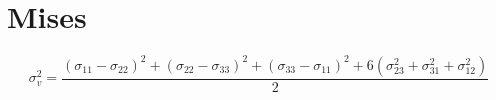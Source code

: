 
\section{Mises}

\begin{equation}\label{key}
\sigma_v^2 = \dfrac{ \left( \sigma_{11}-\sigma_{22} \right)^2 + \left( \sigma_{22}-\sigma_{33} \right)^2 + \left( \sigma_{33}-\sigma_{11} \right)^2 + 6 \left( \sigma_{23}^2 + \sigma_{31}^2 + \sigma_{12}^2 \right)}{2}
\end{equation}